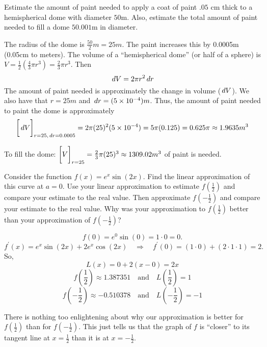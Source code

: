 \documentclass[nooutcomes]{ximera}
\begin{document}
\begin{problem}
Estimate the amount of paint needed to apply a coat of paint $.05$ cm thick to a hemispherical dome with diameter $50$m.  Also, estimate the total amount of paint needed to fill a dome $50.001$m in diameter.
		\begin{freeResponse}
		The radius of the dome is $\frac{50}{2}m=25m$.  The paint increases this by 0.0005m (0.05cm to meters).  The volume of a ``hemispherical dome'' (or half of a sphere) is $V = \frac{1}{2} \left(\frac{4}{3} \pi r^3 \right) = \frac{2}{3} \pi r^3$.  Then
		$$ \,d V = 2 \pi r^2 \,d r  $$
		The amount of paint needed is approximately the change in volume ($\,d V$).  We also have that $r=25m$ and $\,d r = (5 \times 10^{-4}) m$.  Thus, the amount of paint needed to paint the dome is approximately
		$$ \bigg[ \,d V \bigg]_{r=25,\,d r = 0.0005} = 2 \pi (25)^2 (5 \times 10^{-4}) = 5 \pi (0.125) = 0.625 \pi \approx 1.9635 m^3$$
		
		To fill the dome: $\bigg[ V \bigg]_{r=25}=\frac{2}{3}\pi (25)^3 \approx 1309.02 m^3$ of paint is needed.
		\end{freeResponse}
			
			
		
\end{problem}











\begin{problem}
Consider the function $f(x) = e^x \sin (2x)$.  Find the linear approximation of this curve at $a=0$.  Use your linear approximation to estimate $f\left( \frac{1}{2} \right)$ and compare your estimate to the real value.  Then approximate $f\left( - \frac{1}{2} \right)$ and compare your estimate to the real value.  Why was your approximation to $f\left( \frac{1}{2} \right)$ better than your approximation of $f\left( - \frac{1}{2} \right)$?  
		\begin{freeResponse}
		$$f(0) = e^0 \sin(0) = 1 \cdot 0 = 0.$$  
		$$f^\prime (x) = e^x \sin(2x) + 2e^x \cos(2x) \quad \Longrightarrow \quad f^\prime (0) = (1 \cdot 0) + (2 \cdot 1 \cdot 1) = 2.$$
		So,
		$$ L(x) = 0 + 2(x-0) = 2x $$
		$$ f \left( \frac{1}{2} \right) \approx 1.387351 \quad \text{and} \quad L\left( \frac{1}{2} \right) = 1 $$
		$$ f \left( - \frac{1}{2} \right) \approx -0.510378 \quad \text{and} \quad L\left( - \frac{1}{2} \right) = - 1 $$
		
		There is nothing too enlightening about why our approximation is better for $f\left( \frac{1}{2} \right)$ than for $f\left( - \frac{1}{2} \right)$.  This just tells us that the graph of $f$ is ``closer'' to its tangent line at $x=\frac{1}{2}$ than it is at $x=-\frac{1}{2}$.  
		\end{freeResponse}
			
			
	
\end{problem}
\end{document}
